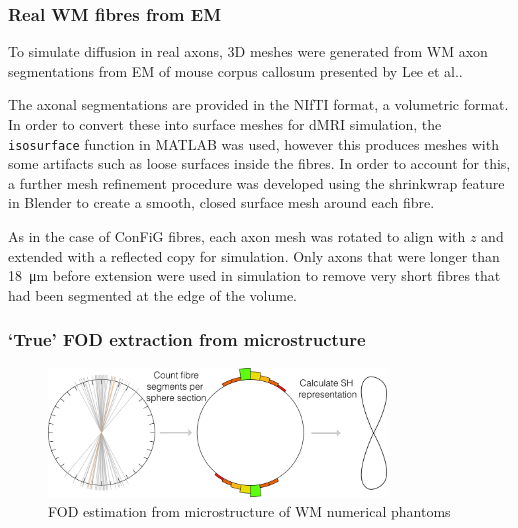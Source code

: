
\subsubsection{Real WM fibres from EM}
\label{sec:frf_real_axon_meshing}
To simulate diffusion in real axons, 3D meshes were generated from \ac{WM} axon segmentations from \acf{EM} of mouse corpus callosum presented by Lee et al.\cite{Lee2019b}.

The axonal segmentations are provided in the NIfTI format, a volumetric format. In order to convert these into surface meshes for \ac{dMRI} simulation, the \texttt{isosurface} function in MATLAB was used, however this produces meshes with some artifacts such as loose surfaces inside the fibres.
In order to account for this, a further mesh refinement procedure was developed using the shrinkwrap feature in Blender to create a smooth, closed surface mesh around each fibre.

As in the case of ConFiG fibres, each axon mesh was rotated to align with $z$ and extended with a reflected copy for simulation. Only axons that were longer than \SI{18}{\micro\metre} before extension were used in simulation to remove very short fibres that had been segmented at the edge of the volume. 

\subsubsection{`True' FOD extraction from microstructure}
\label{sec:frf_true_frf_extraction}
\begin{figure}
  \centering
  \includegraphics[width=0.8\textwidth]{figures/frf_experiment/od_estimation}
  \caption[\acs{FOD} estimation in \acs{WM} numerical phantoms]{\acs{FOD} estimation from microstructure of \ac{WM} numerical phantoms}
  \label{fig:frf_od_estimation}
\end{figure}


